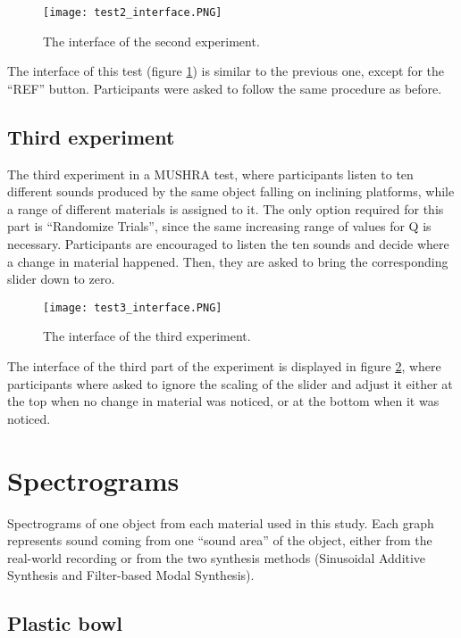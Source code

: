 \begin{figure}[H]
    \centering  
     \texttt{[image: test2\_interface.PNG]}
        \caption{The interface of the second experiment.}
        \label{fig:t2_ui}
\end{figure}

The interface of this test (figure \ref{fig:t2_ui}) is similar to the previous one, except for the ``REF'' button. Participants were asked to follow the same procedure as before.

\section*{Third experiment}
The third experiment in a \gls{MUSHRA} test, where participants listen to ten different sounds produced by the same object falling on inclining platforms, while a range of different materials is assigned to it. The only option required for this part is ``Randomize Trials'', since the same increasing range of values for \gls{Q} is necessary. Participants are encouraged to listen the ten sounds and decide where a change in material happened. Then, they are asked to bring the corresponding slider down to zero.

\begin{figure}[H]
    \centering  
     \texttt{[image: test3\_interface.PNG]}
        \caption{The interface of the third experiment.}
        \label{fig:t3_ui}
\end{figure}

The interface of the third part of the experiment is displayed in figure \ref{fig:t3_ui}, where participants where asked to ignore the scaling of the slider and adjust it either at the top when no change in material was noticed, or at the bottom when it was noticed.

\chapter{Spectrograms}\label{ap:spectrograms}
Spectrograms of one object from each material used in this study. Each graph represents sound coming from one ``sound area'' of the object, either from the real-world recording or from the two synthesis methods (Sinusoidal Additive Synthesis and Filter-based Modal Synthesis).
\section*{Plastic bowl}

